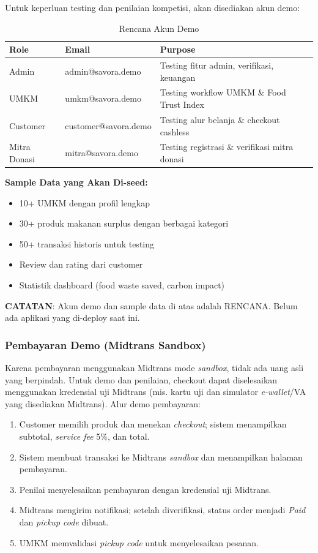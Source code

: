 Untuk keperluan testing dan penilaian kompetisi, akan disediakan akun demo:

\begin{table}[htbp]
\centering
\caption{Rencana Akun Demo}
\label{tab:akun_demo}
\begin{tabularx}{\textwidth}{|l|X|X|}
\hline
\textbf{Role} & \textbf{Email} & \textbf{Purpose} \\
\hline
Admin & admin@savora.demo & Testing fitur admin, verifikasi, keuangan \\
\hline
UMKM & umkm@savora.demo & Testing workflow UMKM \& Food Trust Index \\
\hline
Customer & customer@savora.demo & Testing alur belanja \& checkout cashless \\
\hline
Mitra Donasi & mitra@savora.demo & Testing registrasi \& verifikasi mitra donasi \\
\hline
\end{tabularx}
\end{table}

\textbf{Sample Data yang Akan Di-seed:}
\begin{itemize}[leftmargin=*]
    \item 10+ UMKM dengan profil lengkap
    \item 30+ produk makanan surplus dengan berbagai kategori
    \item 50+ transaksi historis untuk testing
    \item Review dan rating dari customer
    \item Statistik dashboard (food waste saved, carbon impact)
\end{itemize}

\textbf{CATATAN}: Akun demo dan sample data di atas adalah RENCANA. Belum ada aplikasi yang di-deploy saat ini.

\subsubsection{Pembayaran Demo (Midtrans Sandbox)}

Karena pembayaran menggunakan Midtrans mode \textit{sandbox}, tidak ada uang asli yang berpindah.
Untuk demo dan penilaian, checkout dapat diselesaikan menggunakan kredensial uji Midtrans (mis.
kartu uji dan simulator \textit{e-wallet}/VA yang disediakan Midtrans). Alur demo pembayaran:

\begin{enumerate}[leftmargin=*]
    \item Customer memilih produk dan menekan \textit{checkout}; sistem menampilkan subtotal,
    \textit{service fee} 5\%, dan total.
    \item Sistem membuat transaksi ke Midtrans \textit{sandbox} dan menampilkan halaman pembayaran.
    \item Penilai menyelesaikan pembayaran dengan kredensial uji Midtrans.
    \item Midtrans mengirim notifikasi; setelah diverifikasi, status order menjadi \emph{Paid} dan
    \textit{pickup code} dibuat.
    \item UMKM memvalidasi \textit{pickup code} untuk menyelesaikan pesanan.
\end{enumerate}

